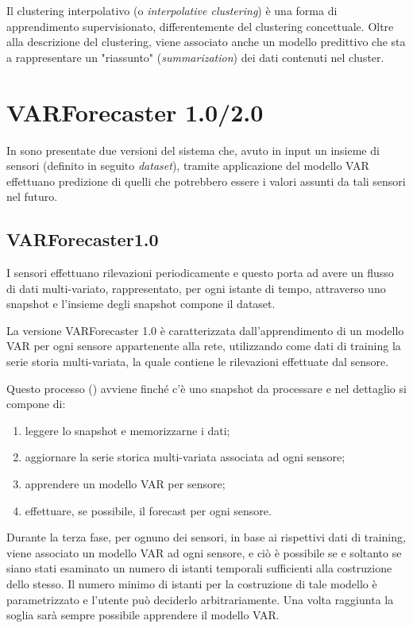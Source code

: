 \documentclass[12pt,a4paper,twoside,openright]{book}
\begin{document}
Il clustering interpolativo (o \textit{interpolative clustering}) è una forma di apprendimento supervisionato, differentemente del clustering concettuale. Oltre alla descrizione del clustering, viene associato anche un modello predittivo che sta a rappresentare un "riassunto" (\textit{summarization}) dei dati contenuti nel cluster.
\newpage
\section{VARForecaster 1.0/2.0}
In \cite{donato} sono presentate due versioni del sistema che, avuto in input un insieme di sensori (definito in seguito \textit{dataset}), tramite applicazione del modello VAR effettuano predizione di quelli che potrebbero essere i valori assunti da tali sensori nel futuro. 


\subsection{VARForecaster1.0}
I sensori effettuano rilevazioni periodicamente e questo porta ad avere un flusso di dati multi-variato, rappresentato, per ogni istante di tempo, attraverso uno snapshot e l'insieme degli snapshot compone il dataset. 

La versione VARForecaster 1.0 è caratterizzata dall'apprendimento di un modello VAR per ogni sensore appartenente alla rete, utilizzando come dati di training la serie storia multi-variata, la quale contiene le rilevazioni effettuate dal sensore.

Questo processo (\cite{donato}) avviene finché c'è uno snapshot da processare e nel dettaglio si compone di:
\begin{enumerate}
\item leggere lo snapshot e memorizzarne i dati;
\item aggiornare la serie storica multi-variata associata ad ogni sensore;
\item apprendere un modello VAR per sensore;
\item effettuare, se possibile, il forecast per ogni sensore.
\end{enumerate}
Durante la terza fase, per ognuno dei sensori, in base ai rispettivi dati di training, viene associato un modello VAR ad ogni sensore, e ciò è possibile se e soltanto se siano stati esaminato un numero di istanti temporali sufficienti alla costruzione dello stesso. Il numero minimo di istanti per la costruzione di tale modello è parametrizzato e l'utente può deciderlo arbitrariamente. Una volta raggiunta la soglia sarà sempre possibile apprendere il modello VAR.
\end{document}
